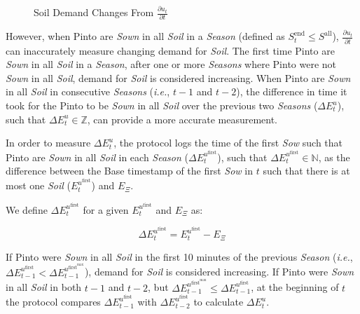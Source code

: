 \documentclass[tikz]{article}
\newcommand{\term}[1]{\textsl{#1}}
\begin{document}

\vspace*{-3.5mm}
\begin{figure}[h!]
    \centering
    
    \vspace*{-10.5mm}
    \caption{Soil Demand Changes From $\frac{\partial u_{t}}{\partial t}$}
    \label{Soil Demand Changes From Derivative}
\end{figure}

However, when Pinto are \term{Sown} in all \term{Soil} in a \term{Season} (defined as $S_{t}^{\text{end}} \leq S^{\text{all}}$), $\frac{\partial u_{t}}{\partial t}$ can inaccurately measure changing demand for \term{Soil}. The first time Pinto are \term{Sown} in all \term{Soil} in a \term{Season}, after one or more \term{Seasons} where Pinto were not \term{Sown} in all \term{Soil}, demand for \term{Soil} is considered increasing. When Pinto are \term{Sown} in all \term{Soil} in consecutive \term{Seasons} (\textit{i.e.}, $t-1$ and $t-2$), the difference in time it took for the Pinto to be \term{Sown} in all \term{Soil} over the previous two \term{Seasons} ($\Delta E_{t}^{u}$), such that $\Delta E_{t}^{u} \in \mathbb{Z}$, can provide a more accurate measurement. 

In order to measure $\Delta E_{t}^{u}$, the protocol logs the time of the first \term{Sow} such that Pinto are \term{Sown} in all \term{Soil} in each \term{Season} ($\Delta E_{t}^{u^{\text{first}}}$), such that $\Delta E_{t}^{u^{\text{first}}} \in \mathbb{N}$, as the difference between the Base timestamp of the first \term{Sow} in $t$ such that there is at most one \term{Soil} ($E_{t}^{u^{\text{first}}}$) and $E_{\Xi}$. 

We define $\Delta E_{t}^{u^{\text{first}}}$ for a given $E_{t}^{u^{\text{first}}}$ and $E_{\Xi}$ as:

    $$
        \Delta E_{t}^{u^{\text{first}}} = 
            E_{t}^{u^{\text{first}}} - E_{\Xi}
    $$

If Pinto were \term{Sown} in all \term{Soil} in the first 10 minutes of the previous \term{Season} (\textit{i.e.}, $\Delta E_{t-1}^{u^{\text{first}}} < \Delta E_{t-1}^{u^{\text{first}^{\text{max}}}}$), demand for \term{Soil} is considered increasing. If Pinto were \term{Sown} in all \term{Soil} in both $t-1$ and $t-2$, but $\Delta E_{t-1}^{u^{\text{first}^{\text{max}}}} \leq \Delta E_{t-1}^{u^{\text{first}}}$, at the beginning of $t$ the protocol compares $\Delta E_{t-1}^{u^{\text{first}}}$ with $\Delta E_{t-2}^{u^{\text{first}}}$ to calculate $\Delta E_{t}^{u}$.
\end{document}
